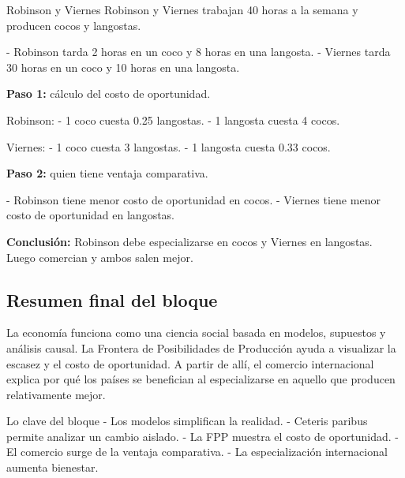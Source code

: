 \begin{ejercicio}{Robinson y Viernes}
Robinson y Viernes trabajan 40 horas a la semana y producen cocos y langostas.

- Robinson tarda 2 horas en un coco y 8 horas en una langosta.
- Viernes tarda 30 horas en un coco y 10 horas en una langosta.

\textbf{Paso 1:} cálculo del costo de oportunidad.

Robinson:
- 1 coco cuesta 0.25 langostas.
- 1 langosta cuesta 4 cocos.

Viernes:
- 1 coco cuesta 3 langostas.
- 1 langosta cuesta 0.33 cocos.

\textbf{Paso 2:} quien tiene ventaja comparativa.

- Robinson tiene menor costo de oportunidad en cocos.
- Viernes tiene menor costo de oportunidad en langostas.

\textbf{Conclusión:}
Robinson debe especializarse en cocos y Viernes en langostas. Luego comercian y ambos salen mejor.
\end{ejercicio}

\subsection{Resumen final del bloque}

La economía funciona como una ciencia social basada en modelos, supuestos y análisis causal. La Frontera de Posibilidades de Producción ayuda a visualizar la escasez y el costo de oportunidad. A partir de allí, el comercio internacional explica por qué los países se benefician al especializarse en aquello que producen relativamente mejor.

\begin{resumen}{Lo clave del bloque}
- Los modelos simplifican la realidad.
- Ceteris paribus permite analizar un cambio aislado.
- La FPP muestra el costo de oportunidad.
- El comercio surge de la ventaja comparativa.
- La especialización internacional aumenta bienestar.
\end{resumen}

